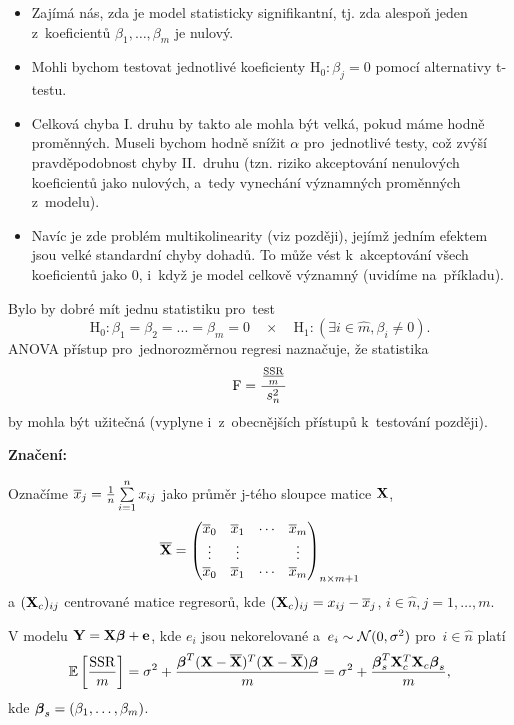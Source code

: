 \begin{itemize}
\item Zajímá nás, zda je model statisticky signifikantní, tj. zda alespoň jeden z~koeficientů $\beta_1,\dots, \beta_m$ je nulový.
\item Mohli bychom testovat jednotlivé koeficienty $\text{H}_0 : \beta_j = 0$ pomocí alternativy t-testu.
\item Celková chyba I. druhu by takto ale mohla být velká, pokud máme hodně proměnných. Museli bychom hodně snížit $\alpha$ pro~jednotlivé testy, což zvýší pravděpodobnost chyby II.~druhu (tzn. riziko akceptování nenulových koeficientů jako nulových, a~tedy vynechání významných proměnných z~modelu).
\item Navíc je zde problém multikolinearity (viz později), jejímž jedním efektem jsou velké standardní chyby dohadů. To může vést k~akceptování všech koeficientů jako 0, i~když je model celkově významný (uvidíme na~příkladu).
\end{itemize}

Bylo by dobré mít jednu statistiku pro~test
 $$
\text{H}_0 : \beta_1 = \beta_2 = ... = \beta_m = 0 \quad \times \quad \text{H}_1 : (\exists i\in \widehat{m}, \beta_i \neq 0).
 $$
ANOVA přístup pro~jednorozměrnou regresi naznačuje, že statistika
 $$
\text{F} = \frac{\frac{\mathrm{SSR}}{m}}{s_n^2}
 $$
by mohla být užitečná (vyplyne i~z~obecnějších přístupů k~testování později).

\textbf{Značení:}

Označíme $\overline{x}_j = \frac{1}{n} \sum\limits_{i=1}^{n} x_{ij}$ jako průměr j-tého sloupce matice $\mathbf{X}$,
 $$
	\overline{\mathbf{X}} = \begin{pmatrix}
	\overline{x}_0 & \overline{x}_1 & \cdots & \overline{x}_m \\
	\vdots & \vdots & & \vdots \\
	\overline{x}_0 & \overline{x}_1 & \cdots & \overline{x}_m
	\end{pmatrix}_{n \times m+1} 
 $$
 a $(\mathbf{X}_c)_{ij}$ centrované matice regresorů, kde $(\mathbf{X}_c)_{ij} = x_{ij} - \overline{x}_j$, $i\in\widehat{n}, j = 1,\dots, m$.

\begin{theorem}
	V modelu $\mathbf{Y} = \mathbf{X} \boldsymbol{\beta} + \mathbf{e}$, kde $e_i$ jsou nekorelované a~$e_i \sim \mathcal{N}(0,\sigma^2)$ pro~$i  \in\widehat{n} $ platí
	 $$
		\mathbb{E} \left[\frac{\mathrm{SSR}}{m} \right] = \sigma^2 + \frac{\boldsymbol{\beta}^T(\mathbf{X} - \overline{\mathbf{X}})^T(\mathbf{X} - \overline{\mathbf{X}}) \boldsymbol{\beta}}{m} = \sigma^2 + \frac{\boldsymbol{\beta}_s^T \mathbf{X}_c^T \mathbf{X}_c \boldsymbol{\beta}_s}{m},
	 $$
	kde $\boldsymbol{\beta}_s = (\beta_1,\dots, \beta_m)$.
\end{theorem}

